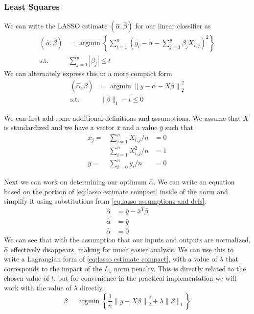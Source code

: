 \documentclass[journal,onecolumn]{IEEEtran}
\DeclareMathOperator{\argmin}{argmin}
\begin{document}
\subsubsection{Least Squares}
We can write the LASSO estimate \((\hat{\alpha}, \hat{\beta})\) for our linear classifier as
\begin{equation}\label{eq:lasso estimate}
\begin{aligned}
(\hat{\alpha}, \hat{\beta}) &= \argmin \left\{ \sum_{i=1}^{n} \left(y_i-\alpha-\sum_{j=1}^p \beta_j X_{i,j}\right)^2 \right\} \\
\textrm{s.t.} &\sum^p_{j=1} |\beta_j| \leq t
\end{aligned}
\end{equation}
We can alternately express this in a more compact form
\begin{equation}\label{eq:lasso estimate compact}
\begin{aligned}
(\hat{\alpha}, \hat{\beta}) &= \argmin \left\|y-\alpha-X \beta\right\|^2_2 \\
\textrm{s.t.} &\|\beta\|_1 - t \leq 0
\end{aligned}
\end{equation}


We can first add some additional definitions and assumptions. We assume that \(X\) is standardized and we have a vector \(\bar{x}\) and a value \(\bar{y}\) such that
\begin{equation}\label{eq:lasso assumptions and defs}
\begin{aligned}
\bar{x}_j = &\sum_{i=1}^n X_{i, j} / n &= 0 \\
&\sum_{i=1}^n X_{i, j}^2 / n &= 1 \\
\bar{y} = &\sum_{i=0}^n y_i / n &= 0
\end{aligned}
\end{equation}

Next we can work on determining our optimum \(\hat{\alpha}\). We can write an equation based on the portion of \eqref{eq:lasso estimate compact} inside of the norm and simplify it using substitutions from \eqref{eq:lasso assumptions and defs}.
\begin{equation}\label{eq:lasso alpha}
\begin{aligned}
\hat{\alpha} &= \bar{y} - \bar{x}^T \beta \\
\hat{\alpha} &= \bar{y} \\
\hat{\alpha} &= 0
\end{aligned}
\end{equation}
We can see that with the assumption that our inputs and outputs are normalized, \(\hat{\alpha}\) effectively disappears, making for much easier analysis. We can use this to write a Lagrangian form of \eqref{eq:lasso estimate compact}, with a value of \(\lambda\) that corresponds to the impact of the \(L_1\) norm penalty. This is directly related to the chosen value of \(t\), but for convenience in the practical implementation we will work with the value of \(\lambda\) directly.
\begin{equation}\label{eq:lasso estimate lagrangian}
\hat{\beta} = \argmin \left\{ \frac{1}{n}\left\|y-X \beta\right\|^2_2 + \lambda \|\beta\|_1 \right\}
\end{equation}
\end{document}
